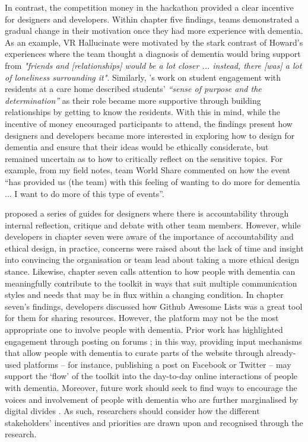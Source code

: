 In contrast, the competition money in the hackathon provided a clear incentive for designers and developers. Within chapter five findings, teams demonstrated a gradual change in their motivation once they had more experience with dementia. As an example, VR Hallucinate were motivated by the stark contrast of Howard’s experiences where the team thought a diagnosis of dementia would bring support from \textit{"friends and [relationships] would be a lot closer ... instead, there [was] a lot of loneliness surrounding it"}. Similarly, \citeauthor{foley_student_2020}'s \citeyear{foley_student_2020} work on student engagement with residents at a care home described students' \textit{``sense of purpose and the determination''} as their role became more supportive through building relationships by getting to know the residents. With this in mind, while the incentive of money encouraged participants to attend, the findings present how designers and developers became more interested in exploring how to design for dementia and ensure that their ideas would be ethically considerate, but remained uncertain as to how to critically reflect on the sensitive topics. For example, from my field notes, team World Share commented on how the event ``has provided us (the team) with this feeling of wanting to do more for dementia ... I want to do more of this type of events''.

\cite{frauenberger2015pursuit} proposed a series of guides for designers where there is accountability through internal reflection, critique and debate with other team members. However, while developers in chapter seven were aware of the importance of accountability and ethical design, in practice, concerns were raised about the lack of time and insight into convincing the organisation or team lead about taking a more ethical design stance. Likewise, chapter seven calls attention to how people with dementia can meaningfully contribute to the toolkit in ways that suit multiple communication styles and needs that may be in flux within a changing condition. In chapter seven's findings, developers discussed how Github Awesome Lists was a great tool for them for sharing resources. However, the platform may not be the most appropriate one to involve people with dementia. Prior work has highlighted engagement through posting on forums \citep{johnson2020roles}; in this way, providing input mechanisms that allow people with dementia to curate parts of the website through already-used platforms – for instance, publishing a post on Facebook or Twitter \citep{talbot_how_2020} – may support the `flow' of the toolkit into the day-to-day online interactions of people with dementia. Moreover, future work should seek to find ways to encourage the voices and involvement of people with dementia who are further marginalised by digital divides \citep{harrington_forgotten_2020}. As such, researchers should consider how the different stakeholders' incentives and priorities are drawn upon and recognised through the research.

